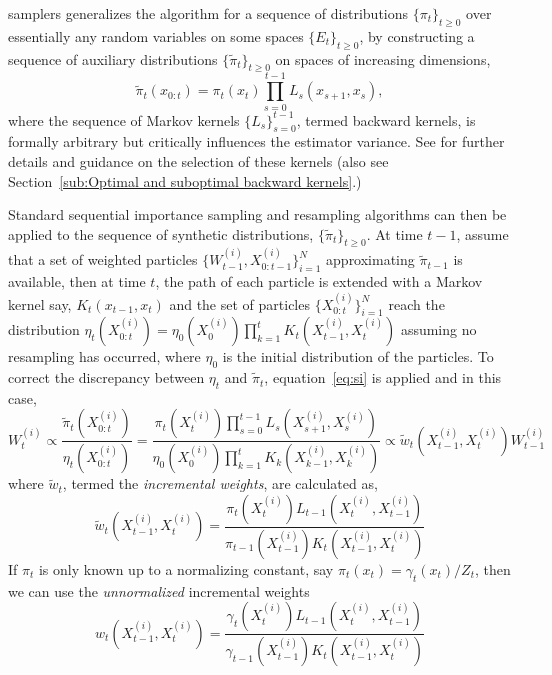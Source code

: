 \smc samplers generalizes the \sis algorithm for a sequence of distributions
$\{\pi_t\}_{t\ge0}$ over essentially any random variables on some spaces
$\{E_t\}_{t\ge0}$, by constructing a sequence of auxiliary distributions
$\{\tilde\pi_t\}_{t\ge0}$ on spaces of increasing dimensions,
\begin{equation}
  \tilde\pi_t(x_{0:t})=\pi_t (x_t) \prod_{s=0}^{t-1} L_s(x_{s+1},x_s),
\end{equation}
where the sequence of Markov kernels $\{L_s\}_{s=0}^{t-1}$, termed backward
kernels, is formally arbitrary but critically influences the estimator
variance. See \cite{DelMoral:2006hc} for further details and guidance on the
selection of these kernels (also see Section~\ref{sub:Optimal and suboptimal
  backward kernels}.)

Standard sequential importance sampling and resampling algorithms can then be
applied to the sequence of synthetic distributions, $\{\tilde\pi_t\}_{t\ge0}$.
At time $t-1$, assume that a set of weighted particles
$\{W_{t-1}^{(i)},X_{0:t-1}^{(i)}\}_{i=1}^N$ approximating $\tilde\pi_{t-1}$ is
available, then at time $t$, the path of each particle is extended with a
Markov kernel say, $K_t(x_{t-1}, x_t)$ and the set of particles
$\{X_{0:t}^{(i)}\}_{i=1}^N$ reach the distribution $\eta_t(X_{0:t}^{(i)}) =
\eta_0(X_0^{(i)})\prod_{k=1}^tK_t(X_{t-1}^{(i)}, X_t^{(i)})$ assuming no
resampling has occurred, where $\eta_0$ is the initial distribution of the
particles. To correct the discrepancy between $\eta_t$ and $\tilde\pi_t$,
equation~\ref{eq:si} is applied and in this case,
\begin{equation}
  W_t^{(i)} \propto \frac{\tilde\pi_t(X_{0:t}^{(i)})}{\eta_t(X_{0:t}^{(i)})}
  = \frac{\pi_t(X_t^{(i)})\prod_{s=0}^{t-1}L_s(X_{s+1}^{(i)}, X_s^{(i)})}
  {\eta_0(X_0^{(i)})\prod_{k=1}^tK_k(X_{k-1}^{(i)},X_k^{(i)})}
  \propto \tilde{w}_t(X_{t-1}^{(i)}, X_t^{(i)})W_{t-1}^{(i)}
\end{equation}
where $\tilde{w}_t$, termed the \emph{incremental weights}, are calculated as,
\begin{equation}
  \tilde{w}_t(X_{t-1}^{(i)},X_t^{(i)}) =
  \frac{\pi_t(X_t^{(i)})L_{t-1}(X_t^{(i)}, X_{t-1}^{(i)})}
  {\pi_{t-1}(X_{t-1}^{(i)})K_t(X_{t-1}^{(i)}, X_t^{(i)})}
\end{equation}
If $\pi_t$ is only known up to a normalizing constant, say $\pi_t(x_t) =
\gamma_t(x_t)/Z_t$, then we can use the \emph{unnormalized} incremental
weights
\begin{equation}
  w_t(X_{t-1}^{(i)},X_t^{(i)}) =
  \frac{\gamma_t(X_t^{(i)})L_{t-1}(X_t^{(i)}, X_{t-1}^{(i)})}
  {\gamma_{t-1}(X_{t-1}^{(i)})K_t(X_{t-1}^{(i)}, X_t^{(i)})}
\end{equation}
